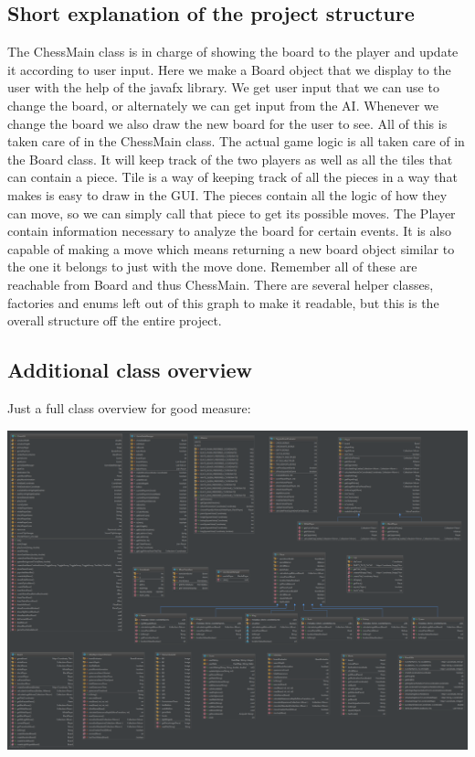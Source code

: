 \documentclass{article}
\begin{document}
    \subsection{Short explanation of the project structure}
    The ChessMain class is in charge of showing the board to the player and update it according to user input.
	Here we make a Board object that we display to the user with the help of the javafx library.
	We get user input that we can use to change the board, or alternately we can get input from the AI.
	Whenever we change the board we also draw the new board for the user to see.
	All of this is taken care of in the ChessMain class.
	The actual game logic is all taken care of in the Board class.
	It will keep track of the two players as well as all the tiles that can contain a piece.
	Tile is a way of keeping track of all the pieces in a way that makes is easy to draw in the GUI.
	The pieces contain all the logic of how they can move,
	so we can simply call that piece to get its possible moves.
	The Player contain information necessary to analyze the board for certain events.
	It is also capable of making a move
	which means returning a new board object similar to the one it belongs to just with the move done.
	Remember all of these are reachable from Board and thus ChessMain.
    There are several helper classes, factories and enums left out of this graph to make it readable, but this is the overall structure off the entire project.

    \vspace{30cm}
    \subsection{Additional class overview}
    Just a full class overview for good measure:
    \begin{center}
    \includegraphics[scale=0.15]{extra-class-overview.png}
    \end{center}
\end{document}

